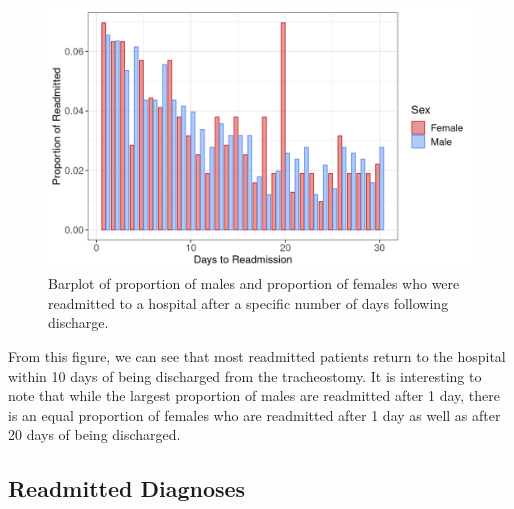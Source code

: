 \documentclass[sn-basic,pdflatex]{sn-jnl}
\theoremstyle{remark}
\theoremstyle{definition}
\begin{document}
\begin{figure}[H]

{\centering \includegraphics[width=0.9\linewidth]{figures/daysto} 

}

\caption{Barplot of proportion of males and proportion of females who were readmitted to a hospital after a specific number of days following discharge.}\label{fig:daysto}
\end{figure}

From this figure, we can see that most readmitted patients return to the
hospital within 10 days of being discharged from the tracheostomy. It is
interesting to note that while the largest proportion of males are
readmitted after 1 day, there is an equal proportion of females who are
readmitted after 1 day as well as after 20 days of being discharged.

\hypertarget{sec4C}{%
\subsection{Readmitted Diagnoses}\label{sec4C}}
\end{document}
